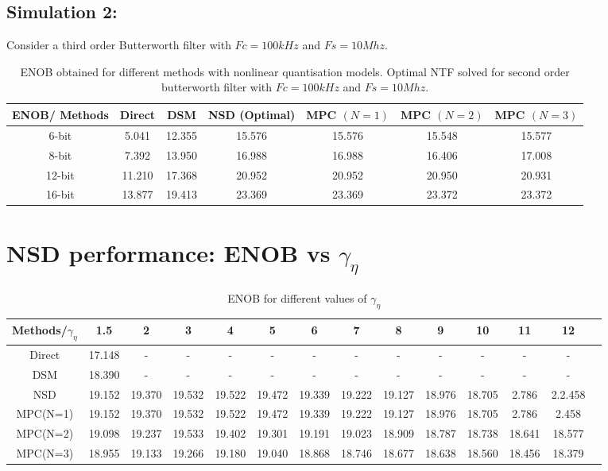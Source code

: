 \documentclass[a4paper]{article}
\begin{document}
\subsection{Simulation 2:}
Consider a third order Butterworth filter with $Fc = 100 \mathit{kHz}$ and $Fs = 10 \mathit{Mhz}$.
\begin{table}[!h]
	\caption{ENOB obtained for different methods with nonlinear quantisation models. Optimal NTF solved for second order butterworth filter with $Fc = 100 \mathit{kHz}$ and $Fs = 10 \mathit{Mhz}$.}
	\centering
	\begin{tabular}{|c|c|c|c|c|c|c|}
	\hline
	ENOB/ Methods & Direct & DSM & NSD (Optimal) & MPC $(N = 1)$ & MPC $(N= 2)$ & MPC $(N= 3)$  \\
        \hline
        6-bit &5.041 & 12.355 & 15.576 & 15.576 & 15.548 & 15.577\\
        \hline
        8-bit & 7.392 & 13.950 & 16.988  & 16.988 & 16.406 & 17.008\\
         \hline
        12-bit & 11.210 & 17.368 & 20.952 & 20.952 &  20.950 & 20.931\\
	\hline
	16-bit & 13.877 & 19.413 & 23.369  & 23.369 & 23.372& 23.372 \\
	\hline
	\end{tabular}		
\end{table}


\section{NSD performance: ENOB vs $\gamma_{\eta}$}
\begin{table}[!h]
	\caption{ENOB for different values of $\gamma_{\eta}$}
	\centering
	\begin{tabular}{|c|c|c|c|c|c|c|c|c|c|c|c|c|c|}
	\hline
	 Methods/$\gamma_{\eta}$ & 1.5 & 2 & 3 & 4 &5 & 6 & 7 & 8 & 9 &  10 & 11 & 12  \\
        \hline
        Direct &17.148 & - & - & - & - & - & -& - & - & - & - & - \\
        \hline
        DSM &18.390 & - & - & - & - & - & -& - & - & - & - &  - \\
        \hline
        NSD &19.152 & 19.370 & 19.532 & 19.522 & 19.472 & 19.339 &19.222 & 19.127 & 18.976  & 18.705 & 2.786 & 2.2.458\\
        \hline
        MPC(N=1) &19.152 & 19.370 & 19.532 & 19.522 & 19.472 & 19.339 &19.222 & 19.127 & 18.976  & 18.705 & 2.786 & 2.458\\
         \hline
        MPC(N=2) & 19.098& 19.237 & 19.533 & 19.402 & 19.301 & 19.191 & 19.023 & 18.909 & 18.787 & 18.738 & 18.641 & 18.577\\
	\hline
	MPC(N=3)  & 18.955& 19.133 & 19.266 & 19.180 & 19.040 & 18.868 & 18.746& 18.677 & 18.638 & 18.560 & 18.456 & 18.379\\
 


	\hline
	\end{tabular}		
\end{table}
\end{document}
